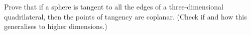Prove that if a sphere is tangent to all the edges of a three-dimensional quadrilateral,
then the points of tangency are coplanar.
\newline (Check if and how this generalises to higher dimensions.)
